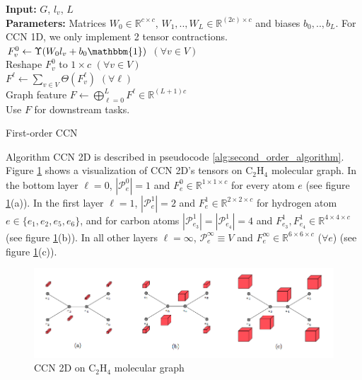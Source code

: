 \documentclass[sigchi]{acmart}
\theoremstyle{definition}
\theoremstyle{theorem}
\theoremstyle{corollary}
\theoremstyle{lemma}
\theoremstyle{remark}
\theoremstyle{prop}
\begin{document}
\begin{algorithm}
{\bfseries Input:} $G$, $l_v$, $L$ \\
{\bfseries Parameters:} Matrices $W_0 \in \mathbb{R}^{c \times c}$, $W_1, .., W_L \in \mathbb{R}^{(2c) \times c}$ and biases $b_0, .., b_L$. For CCN 1D, we only implement 2 tensor contractions. \\
$F_v^0 \leftarrow \Upsilon(W_0 l_v + b_0 \mathbbm{1})$ $(\forall v \in V)$ \\
Reshape $F_v^0$ to $1 \times c$ $(\forall v \in V)$ \\
$F^\ell \leftarrow \sum_{v \in V} \Theta(F_v^\ell)$ $(\forall \ell)$ \\
Graph feature $F \leftarrow \bigoplus\limits_{\ell = 0}^L F^\ell \in \mathbb{R}^{(L + 1)c}$ \\
Use $F$ for downstream tasks.
\caption{\label{alg:first_order_algorithm} First-order CCN}
\end{algorithm}

Algorithm CCN 2D is described in pseudocode \ref{alg:second_order_algorithm}. Figure \ref{fig:second_order} shows a visualization of CCN 2D's tensors on C$_2$H$_4$ molecular graph. In the bottom layer $\ell = 0$, $|\mathcal{P}_e^0| = 1$ and $F_e^0 \in \mathbb{R}^{1 \times 1 \times c}$ for every atom $e$ (see figure \ref{fig:second_order}(a)). In the first layer $\ell = 1$, $|\mathcal{P}_e^1| = 2$ and $F_e^1 \in \mathbb{R}^{2 \times 2 \times c}$ for hydrogen atom $e \in \{e_1, e_2, e_5, e_6\}$, and for carbon atoms $|\mathcal{P}_{e_3}^1| = |\mathcal{P}_{e_4}^1| = 4$ and $F_{e_3}^1, F_{e_4}^1 \in \mathbb{R}^{4 \times 4 \times c}$ (see figure \ref{fig:second_order}(b)). In all other layers $\ell = \infty$, $\mathcal{P}_e^\infty \equiv V$ and $F_e^\infty \in \mathbb{R}^{6 \times 6 \times c}$ ($\forall e$) (see figure \ref{fig:second_order}(c)).
\begin{figure}
\caption{\label{fig:second_order} CCN 2D on C$_2$H$_4$ molecular graph}
\centering
\includegraphics[scale=0.3]{second_order}
\end{figure}
\end{document}

